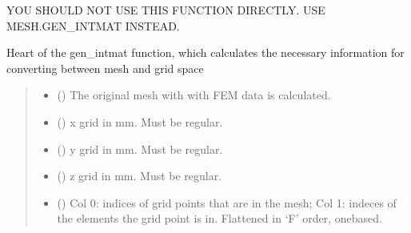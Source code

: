 \documentclass[letterpaper,10pt,english]{sphinxmanual}
\begin{document}
\begin{fulllineitems}
\label{\detokenize{_autosummary/nirfasterff.utils.gen_intmat_impl:nirfasterff.utils.gen_intmat_impl}}
\pysigstartsignatures
\pysiglinewithargsret
{}
{\sphinxparamcomma {}\sphinxparamcomma {}\sphinxparamcomma {}}
{}
\pysigstopsignatures
\sphinxAtStartPar
YOU SHOULD NOT USE THIS FUNCTION DIRECTLY. USE MESH.GEN\_INTMAT INSTEAD.

\sphinxAtStartPar
Heart of the gen\_intmat function, which calculates the necessary information for converting between mesh and grid space
\begin{quote}\begin{description}
\begin{itemize}
\item {} 
\sphinxAtStartPar
{} () \textendash{} The original mesh with with FEM data is calculated.

\item {} 
\sphinxAtStartPar
{} () \textendash{} x grid in mm. Must be regular.

\item {} 
\sphinxAtStartPar
{} () \textendash{} y grid in mm. Must be regular.

\item {} 
\sphinxAtStartPar
{} (\sphinxstyleliteralemphasis{\sphinxupquote{{[}}}\sphinxstyleliteralemphasis{\sphinxupquote{{]} }}) \textendash{} z grid in mm. Must be regular.

\end{itemize}

\sphinxAtStartPar
\begin{itemize}
\item {} 
\sphinxAtStartPar
{} () \textendash{} Col 0: indices of grid points that are in the mesh; Col 1: indeces of the elements the grid point is in. Flattened in ‘F’ order, one\sphinxhyphen{}based.


\end{itemize}
\end{description}
\end{quote}
\end{fulllineitems}
\end{document}
